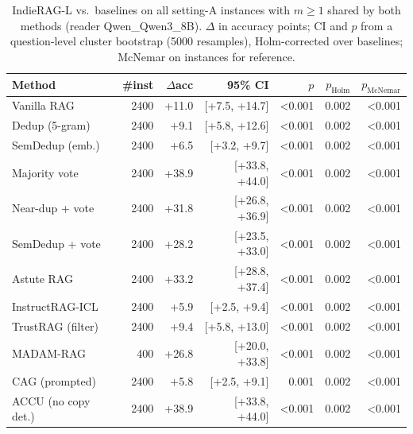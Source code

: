 \begin{table}[tbp]
\centering
\small
\caption{IndieRAG-L vs.\ baselines on all setting-A instances with $m\geq1$ shared by both methods (reader Qwen\_Qwen3\_8B). $\Delta$ in accuracy points; CI and $p$ from a question-level cluster bootstrap (5000 resamples), Holm-corrected over baselines; McNemar on instances for reference.}
\label{tab:sig:Qwen_Qwen3_8B}
\setlength{\tabcolsep}{4pt}
\begin{tabular}{lrrrrrr}
\toprule
Method & \#inst & $\Delta$acc & 95\% CI & $p$ & $p_{\text{Holm}}$ & $p_{\text{McNemar}}$ \\
\midrule
Vanilla RAG & 2400 & +11.0 & [+7.5, +14.7] & <0.001 & 0.002 & <0.001 \\
Dedup (5-gram) & 2400 & +9.1 & [+5.8, +12.6] & <0.001 & 0.002 & <0.001 \\
SemDedup (emb.) & 2400 & +6.5 & [+3.2, +9.7] & <0.001 & 0.002 & <0.001 \\
Majority vote & 2400 & +38.9 & [+33.8, +44.0] & <0.001 & 0.002 & <0.001 \\
Near-dup + vote & 2400 & +31.8 & [+26.8, +36.9] & <0.001 & 0.002 & <0.001 \\
SemDedup + vote & 2400 & +28.2 & [+23.5, +33.0] & <0.001 & 0.002 & <0.001 \\
Astute RAG & 2400 & +33.2 & [+28.8, +37.4] & <0.001 & 0.002 & <0.001 \\
InstructRAG-ICL & 2400 & +5.9 & [+2.5, +9.4] & <0.001 & 0.002 & <0.001 \\
TrustRAG (filter) & 2400 & +9.4 & [+5.8, +13.0] & <0.001 & 0.002 & <0.001 \\
MADAM-RAG & 400 & +26.8 & [+20.0, +33.8] & <0.001 & 0.002 & <0.001 \\
CAG (prompted) & 2400 & +5.8 & [+2.5, +9.1] & 0.001 & 0.002 & <0.001 \\
ACCU (no copy det.) & 2400 & +38.9 & [+33.8, +44.0] & <0.001 & 0.002 & <0.001 \\
\bottomrule
\end{tabular}
\end{table}
